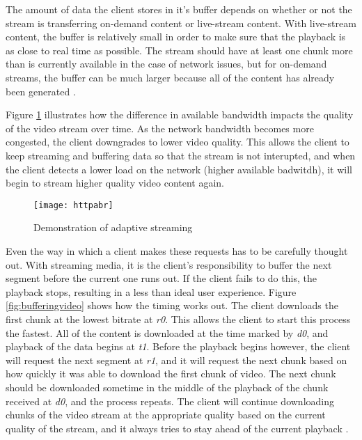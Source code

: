 \documentclass[12pt]{article}
\begin{document}
The amount of data the client stores in it's buffer depends on whether or not the stream is transferring on-demand content or live-stream content.  With live-stream content, the buffer is relatively small in order to make sure that the playback is as close to real time as possible.  The stream should have at least one chunk more than is currently available in the case of network issues, but for on-demand streams, the buffer can be much larger because all of the content has already been generated \cite{5986186}.


Figure \ref{fig:httpabr} illustrates how the difference in available bandwidth impacts the quality of the video stream over time.  As the network bandwidth becomes more congested, the client downgrades to lower video quality.  This allows the client to keep streaming and buffering data so that the stream is not interupted, and when the client detects a lower load on the network (higher available badwitdh), it will begin to stream higher quality video content again.

\begin{figure}[h]
  \begin{center}
    \texttt{[image: httpabr]}
    \caption{Demonstration of adaptive streaming}
    \label{fig:httpabr}
  \end{center}
\end{figure}


Even the way in which a client makes these requests has to be carefully thought out.  With streaming media, it is the client's responsibility to buffer the next segment before the current one runs out.  If the client fails to do this, the playback stops, resulting in a less than ideal user experience.  Figure \ref{fig:bufferingvideo} shows how the timing works out.  The client downloads the first chunk at the lowest bitrate at \textit{r0}.  This allows the client to start this process the fastest.  All of the content is downloaded at the time marked by \textit{d0}, and playback of the data begins at \textit{t1}.  Before the playback begins however, the client will request the next segment at \textit{r1}, and it will request the next chunk based on how quickly it was able to download the first chunk of video.  The next chunk should be downloaded sometime in the middle of the playback of the chunk received at \textit{d0}, and the process repeats.  The client will continue downloading chunks of the video stream at the appropriate quality based on the current quality of the stream, and it always tries to stay ahead of the current playback \cite{Tanwir201674}.
\end{document}
